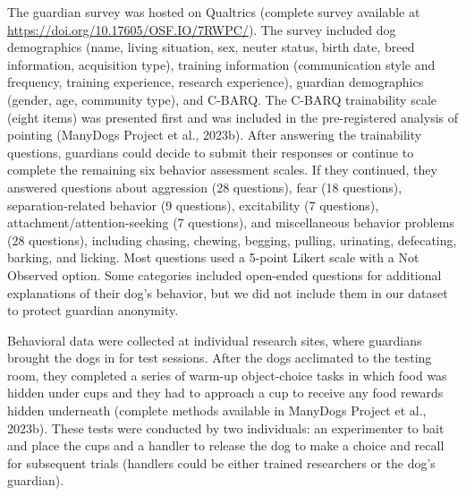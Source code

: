 \documentclass[
  man,floatsintext]{apa6}
\begin{document}
The guardian survey was hosted on Qualtrics (complete survey available at \url{https://doi.org/10.17605/OSF.IO/7RWPC/}). The survey included dog demographics (name, living situation, sex, neuter status, birth date, breed information, acquisition type), training information (communication style and frequency, training experience, research experience), guardian demographics (gender, age, community type), and C-BARQ. The C-BARQ trainability scale (eight items) was presented first and was included in the pre-registered analysis of pointing (ManyDogs Project et al., 2023b). After answering the trainability questions, guardians could decide to submit their responses or continue to complete the remaining six behavior assessment scales. If they continued, they answered questions about aggression (28 questions), fear (18 questions), separation-related behavior (9 questions), excitability (7 questions), attachment/attention-seeking (7 questions), and miscellaneous behavior problems (28 questions), including chasing, chewing, begging, pulling, urinating, defecating, barking, and licking. Most questions used a 5-point Likert scale with a Not Observed option. Some categories included open-ended questions for additional explanations of their dog's behavior, but we did not include them in our dataset to protect guardian anonymity.

Behavioral data were collected at individual research sites, where guardians brought the dogs in for test sessions. After the dogs acclimated to the testing room, they completed a series of warm-up object-choice tasks in which food was hidden under cups and they had to approach a cup to receive any food rewards hidden underneath (complete methods available in ManyDogs Project et al., 2023b). These tests were conducted by two individuals: an experimenter to bait and place the cups and a handler to release the dog to make a choice and recall for subsequent trials (handlers could be either trained researchers or the dog's guardian).
\end{document}
